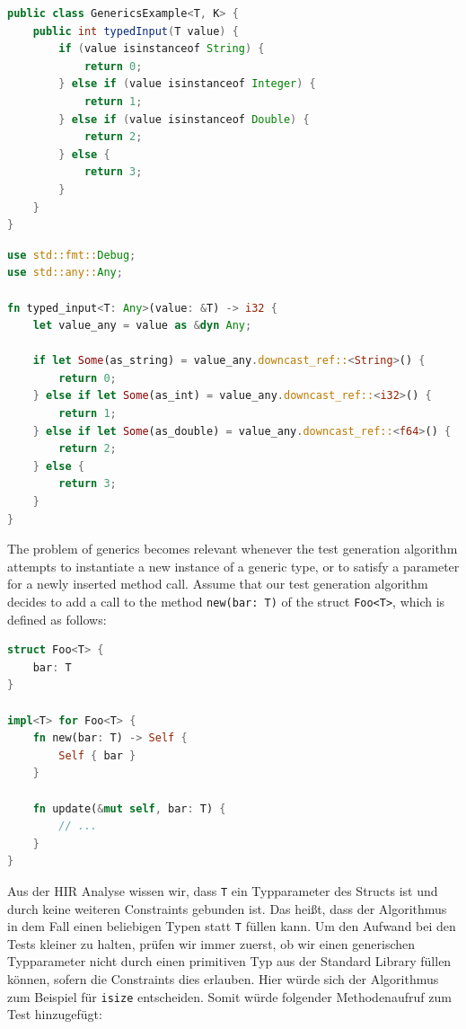 \documentclass{article}
\begin{document}
\begin{lstlisting}[language=Java, style=boxed, caption={The execution path of the generic Java method depends on the concrete type of the argument}, label=lst:java-isinstanceof]
public class GenericsExample<T, K> {
    public int typedInput(T value) {
        if (value isinstanceof String) {
            return 0;
        } else if (value isinstanceof Integer) {
            return 1;
        } else if (value isinstanceof Double) {
            return 2;
        } else {
            return 3;
        }
    }
}
\end{lstlisting}


\begin{lstlisting}[language=Rust, style=boxed, caption={The execution path of the generic Rust function depends on the concrete type of the argument}, label=lst:rust-runtime-reflection]
use std::fmt::Debug;
use std::any::Any;

fn typed_input<T: Any>(value: &T) -> i32 {
    let value_any = value as &dyn Any;

    if let Some(as_string) = value_any.downcast_ref::<String>() {
        return 0;
    } else if let Some(as_int) = value_any.downcast_ref::<i32>() {
        return 1;
    } else if let Some(as_double) = value_any.downcast_ref::<f64>() {
        return 2;
    } else {
        return 3;
    }
}
\end{lstlisting}

The problem of generics becomes relevant whenever the test generation algorithm attempts to instantiate a new instance of a generic type, or to satisfy a parameter for a newly inserted method call. Assume that our test generation algorithm decides to add a call to the method \lstinline{new(bar: T)} of the struct \lstinline{Foo<T>}, which is defined as follows:
\begin{lstlisting}[language=Rust, style=boxed, caption={}, label=lst:basic-generics-example]
struct Foo<T> {
    bar: T
}

impl<T> for Foo<T> {
    fn new(bar: T) -> Self {
        Self { bar }
    }

    fn update(&mut self, bar: T) {
        // ...
    }
}
\end{lstlisting}

Aus der \ac{HIR} Analyse wissen wir, dass \lstinline{T} ein Typparameter des Structs ist und durch keine weiteren Constraints gebunden ist. Das heißt, dass der Algorithmus in dem Fall einen beliebigen Typen statt \lstinline{T} füllen kann. Um den Aufwand bei den Tests kleiner zu halten, prüfen wir immer zuerst, ob wir einen generischen Typparameter nicht durch einen primitiven Typ aus der Standard Library füllen können, sofern die Constraints dies erlauben. Hier würde sich der Algorithmus zum Beispiel für \lstinline{isize} entscheiden. Somit würde folgender Methodenaufruf zum Test hinzugefügt:
\end{document}
